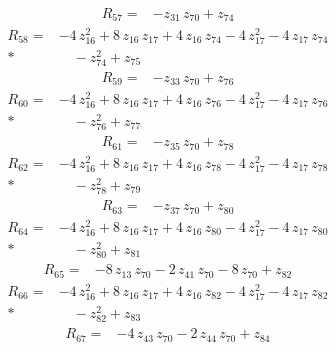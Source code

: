 \documentclass[10pt]{article}
\begin{document}
\begin{align*}
R_{57}={}& - z_{31}\,z_{70} + z_{74}
\end{align*}
\begin{align*}
R_{58}={}& - 4\,z_{16}^{2} + 8\,z_{16}\,z_{17} + 4\,z_{16}\,z_{74} - 4\,z_{17}^{2} - 4\,z_{17}\,z_{74} \\*
&\quad - z_{74}^{2} + z_{75}
\end{align*}
\begin{align*}
R_{59}={}& - z_{33}\,z_{70} + z_{76}
\end{align*}
\begin{align*}
R_{60}={}& - 4\,z_{16}^{2} + 8\,z_{16}\,z_{17} + 4\,z_{16}\,z_{76} - 4\,z_{17}^{2} - 4\,z_{17}\,z_{76} \\*
&\quad - z_{76}^{2} + z_{77}
\end{align*}
\begin{align*}
R_{61}={}& - z_{35}\,z_{70} + z_{78}
\end{align*}
\begin{align*}
R_{62}={}& - 4\,z_{16}^{2} + 8\,z_{16}\,z_{17} + 4\,z_{16}\,z_{78} - 4\,z_{17}^{2} - 4\,z_{17}\,z_{78} \\*
&\quad - z_{78}^{2} + z_{79}
\end{align*}
\begin{align*}
R_{63}={}& - z_{37}\,z_{70} + z_{80}
\end{align*}
\begin{align*}
R_{64}={}& - 4\,z_{16}^{2} + 8\,z_{16}\,z_{17} + 4\,z_{16}\,z_{80} - 4\,z_{17}^{2} - 4\,z_{17}\,z_{80} \\*
&\quad - z_{80}^{2} + z_{81}
\end{align*}
\begin{align*}
R_{65}={}& - 8\,z_{13}\,z_{70} - 2\,z_{41}\,z_{70} - 8\,z_{70} + z_{82}
\end{align*}
\begin{align*}
R_{66}={}& - 4\,z_{16}^{2} + 8\,z_{16}\,z_{17} + 4\,z_{16}\,z_{82} - 4\,z_{17}^{2} - 4\,z_{17}\,z_{82} \\*
&\quad - z_{82}^{2} + z_{83}
\end{align*}
\begin{align*}
R_{67}={}& - 4\,z_{43}\,z_{70} - 2\,z_{44}\,z_{70} + z_{84}
\end{align*}
\end{document}
